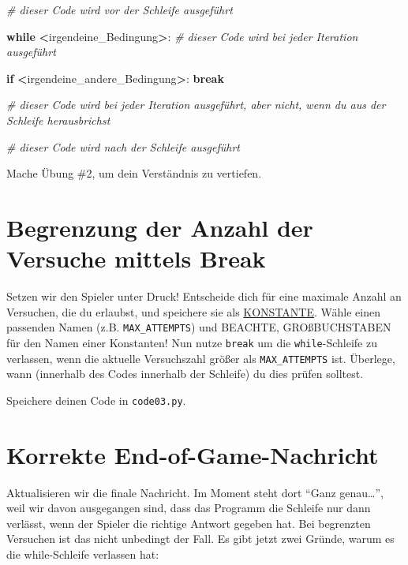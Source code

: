 \documentclass[
]{book}
\newenvironment{Shaded}{\begin{snugshade}}{\end{snugshade}}
\newcommand{\CommentTok}[1]{\textcolor[rgb]{0.56,0.35,0.01}{\textit{#1}}}
\newcommand{\ControlFlowTok}[1]{\textcolor[rgb]{0.13,0.29,0.53}{\textbf{#1}}}
\newcommand{\NormalTok}[1]{#1}
\newcommand{\OperatorTok}[1]{\textcolor[rgb]{0.81,0.36,0.00}{\textbf{#1}}}
\begin{document}
\begin{Shaded}
\begin{Highlighting}[]
\CommentTok{\# dieser Code wird vor der Schleife ausgeführt}

\ControlFlowTok{while} \OperatorTok{\textless{}}\NormalTok{irgendeine\_Bedingung}\OperatorTok{\textgreater{}}\NormalTok{:}
  \CommentTok{\# dieser Code wird bei jeder Iteration ausgeführt}
  
    \ControlFlowTok{if} \OperatorTok{\textless{}}\NormalTok{irgendeine\_andere\_Bedingung}\OperatorTok{\textgreater{}}\NormalTok{:}
        \ControlFlowTok{break}
  
  \CommentTok{\# dieser Code wird bei jeder Iteration ausgeführt, aber nicht, wenn du aus der Schleife herausbrichst}

\CommentTok{\# dieser Code wird nach der Schleife ausgeführt}
\end{Highlighting}
\end{Shaded}

Mache Übung \#2, um dein Verständnis zu vertiefen.

\hypertarget{begrenzung-der-anzahl-der-versuche-mittels-break}{%
\section{Begrenzung der Anzahl der Versuche mittels Break}\label{begrenzung-der-anzahl-der-versuche-mittels-break}}

Setzen wir den Spieler unter Druck! Entscheide dich für eine maximale Anzahl an Versuchen, die du erlaubst, und speichere sie als \protect\hyperlink{constants}{KONSTANTE}. Wähle einen passenden Namen (z.B. \texttt{MAX\_ATTEMPTS}) und BEACHTE, GROßBUCHSTABEN für den Namen einer Konstanten! Nun nutze \texttt{break} um die \texttt{while}-Schleife zu verlassen, wenn die aktuelle Versuchszahl größer als \texttt{MAX\_ATTEMPTS} ist. Überlege, wann (innerhalb des Codes innerhalb der Schleife) du dies prüfen solltest.

Speichere deinen Code in \texttt{code03.py}.

\hypertarget{korrekte-end-of-game-nachricht}{%
\section{Korrekte End-of-Game-Nachricht}\label{korrekte-end-of-game-nachricht}}

Aktualisieren wir die finale Nachricht. Im Moment steht dort ``Ganz genau\ldots{}'', weil wir davon ausgegangen sind, dass das Programm die Schleife nur dann verlässt, wenn der Spieler die richtige Antwort gegeben hat. Bei begrenzten Versuchen ist das nicht unbedingt der Fall. Es gibt jetzt zwei Gründe, warum es die while-Schleife verlassen hat:
\end{document}
